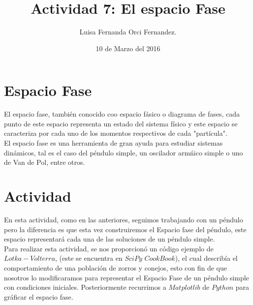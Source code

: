 \documentclass[12pt,letterpaper]{article}
\begin{document}
\title{Actividad 7: El espacio Fase}
\author{Luisa Fernanda Orci Fernandez.}
\date{10 de Marzo del 2016}

\maketitle

\section*{Espacio Fase}
El espacio fase, también conocido coo espacio fásico o diagrama de fases, cada punto de este espacio representa un estado del sistema físico y este espacio se caracteriza por cada uno de los momentos respectivos de cada "partícula". \\
El espacio fase es una herramienta de gran ayuda para estudiar sistemas dinámicos, tal es el caso del péndulo simple, un oscilador armńico simple o uno de Van de Pol, entre otros.

\section*{Actividad}
En esta actividad, como en las anteriores, seguimos trabajando con un péndulo pero la diferencia es que esta vez construiremos el Espacio fase del péndulo, este espacio representará cada una de las soluciones de un péndulo simple.\\
Para realizar esta actividad, se nos proporcionó un código ejemplo de $Lotka-Volterra$, (este se encuentra en $SciPy$ $CookBook$), el cual describía el comportamiento de una población de zorros y conejos, esto con fin de que nosotros lo modificaramos para representar el Espacio Fase de un péndulo simple con condiciones iniciales. Posteriormente recurrimos a $Matplotlib$ de $Python$ para gráficar el espacio fase.\\
\end{document}
